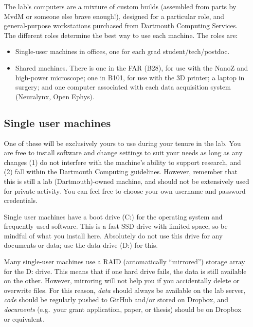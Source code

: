 \documentclass{tufte-book}
\begin{document}
The lab's computers are a mixture of custom builds (assembled from
parts by MvdM or someone else brave enough!), designed for a
particular role, and general-purpose workstations purchased from
Dartmouth Computing Services. The different roles determine the best
way to use each machine. The roles are:

\begin{itemize}
\item{Single-user machines in offices, one for each grad
student/tech/postdoc.}
\item{Shared machines. There is one in the FAR (B28), for use with the
  NanoZ and high-power microscope; one in B101, for use with the 3D
  printer; a laptop in surgery; and one computer associated with each
  data acquisition system (Neuralynx, Open Ephys).}
\end{itemize}

\subsection{Single user machines}

One of these will be exclusively yours to use during your tenure in
the lab. You are free to install software and change settings to suit
your needs as long as any changes (1) do not interfere with the
machine's ability to support research, and (2) fall within the
Dartmouth Computing guidelines. However, remember that
this is still a lab (Dartmouth)-owned machine, and should not be
extensively used for private activity. You can feel free to choose
your own username and password credentials.

Single user machines have a boot drive (C:) for the operating system
and frequently used software. This is a fast SSD drive with limited
space, so be mindful of what you install here. Absolutely do not use
this drive for any documents or data; use the data drive (D:) for this.

Many single-user machines use a RAID (automatically ``mirrored'')
storage array for the D: drive.  This means that if one hard drive
fails, the data is still available on the other.  However, mirroring
will not help you if you accidentally delete or overwrite files. For
this reason, {\it data} should always be available on the lab server,
{\it code} should be regularly pushed to GitHub and/or stored on
Dropbox, and {\it
  documents} (e.g.\ your grant application, paper, or thesis) should
be on Dropbox or equivalent.
\end{document}

